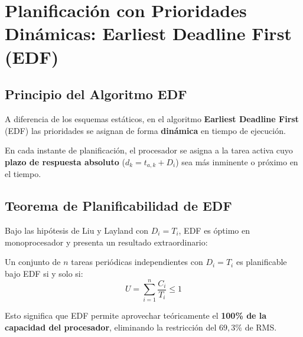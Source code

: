 \section{Planificación con Prioridades Dinámicas: Earliest Deadline First (EDF)}

\subsection{Principio del Algoritmo EDF}
A diferencia de los esquemas estáticos, en el algoritmo \textbf{Earliest Deadline First} (EDF) las prioridades se asignan de forma \textbf{dinámica} en tiempo de ejecución. 

\begin{definicion}
En cada instante de planificación, el procesador se asigna a la tarea activa cuyo \textbf{plazo de respuesta absoluto} ($d_k = t_{a,k} + D_i$) sea más inminente o próximo en el tiempo.
\end{definicion}

\subsection{Teorema de Planificabilidad de EDF}
Bajo las hipótesis de Liu y Layland con $D_i = T_i$, EDF es óptimo en monoprocesador y presenta un resultado extraordinario:

\begin{definicion}
Un conjunto de $n$ tareas periódicas independientes con $D_i = T_i$ es planificable bajo EDF si y solo si:
\begin{equation}
U = \sum_{i=1}^n \frac{C_i}{T_i} \le 1
\end{equation}
\end{definicion}
Esto significa que EDF permite aprovechar teóricamente el \textbf{100\% de la capacidad del procesador}, eliminando la restricción del $69{,}3\%$ de RMS.

